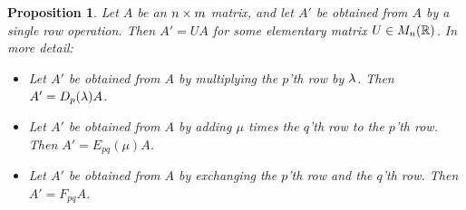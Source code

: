 \documentclass[reqno]{amsart}
\newtheorem{proposition}[theorem]{Proposition}
\theoremstyle{definition}
\begin{document}
\begin{proposition}\label{prop-ro-elem}
 Let $A$ be an $n\times m$ matrix, and let $A'$ be obtained from $A$ by a
 single row operation.  Then $A'=UA$ for some elementary matrix
 $U \in M_n({\mathbb{R}})$.
 In more detail:
 \begin{itemize}
  \item[(a)] Let $A'$ be obtained from $A$ by multiplying the $p$'th
   row by $\lambda$.  Then $A'=D_p(\lambda)A$.
  \item[(b)] Let $A'$ be obtained from $A$ by adding $\mu$ times the
   $q$'th row to the $p$'th row.  Then $A'=E_{pq}(\mu)A$.
  \item[(c)] Let $A'$ be obtained from $A$ by exchanging the $p$'th
   row and the $q$'th row.  Then $A'=F_{pq}A$.
 \end{itemize}
\end{proposition}
\end{document}

